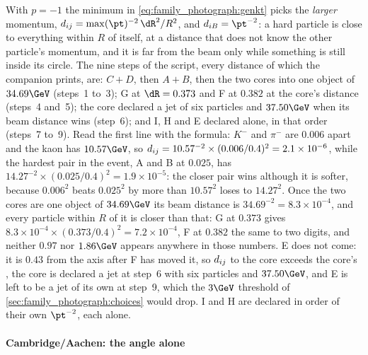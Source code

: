 With $p=-1$ the minimum in \cref{eq:family_photograph:genkt} picks the
\emph{larger} momentum, $\dij=\max(\pt)^{-2}\,\dR^2/R^2$, and
$\diB=\pt^{-2}$: a hard particle is close to everything within $R$ of
itself, at a distance that does not know the other particle's momentum,
and it is far from the beam only while something is still inside its
circle.
The nine steps of the script, every distance of which the companion
prints, are: $C+D$, then $A+B$, then the two cores into one object of
$34.69\GeV$ (steps~1 to~3); G at $\dR=0.373$ and F at $0.382$ at the
core's distance (steps~4 and~5); the core declared a jet of six particles
and $37.50\GeV$ when its beam distance wins (step~6); and I, H and E
declared alone, in that order (steps~7 to~9).
Read the first line with the formula: $K^-$ and $\pi^-$ are $0.006$
apart and the kaon has $10.57\GeV$, so
$d_{ij}=10.57^{-2}\times(0.006/0.4)^2=2.1\times10^{-6}$, while the hardest
pair in the event, A and B at $0.025$, has
$14.27^{-2}\times(0.025/0.4)^2=1.9\times10^{-5}$: the closer pair wins
although it is softer, because $0.006^2$ beats $0.025^2$ by more than
$10.57^2$ loses to $14.27^2$. Once the two cores are one object of
$34.69\GeV$ its beam distance is $34.69^{-2}=8.3\times10^{-4}$, and every
particle within $R$ of it is closer than that: G at $0.373$ gives
$8.3\times10^{-4}\times(0.373/0.4)^2=7.2\times10^{-4}$, F at $0.382$ the
same to two digits, and neither $0.97$ nor $1.86\GeV$ appears anywhere in
those numbers. E does not come: it is $0.43$ from the axis after F has
moved it, so $d_{ij}$ to the core exceeds the core's \diB, the core is
declared a jet at step~6 with six particles and $37.50\GeV$, and E is
left to be a jet of its own at step~9, which the $3\GeV$ threshold of
\cref{sec:family_photograph:choices} would drop. I and H are declared
in order of their own $\pt^{-2}$, each alone.

\paragraph{Cambridge/Aachen: the angle alone}


